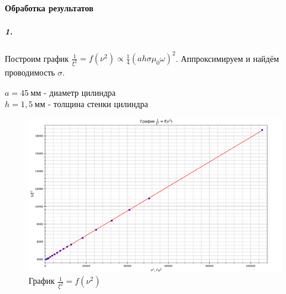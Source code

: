 \documentclass[a4paper,12pt]{article}
\begin{document}
\paragraph{Обработка результатов\\}
\subparagraph{1.} Построим график $\frac{1}{\xi^2}=f(\nu^2)\propto \frac{1}{4}(ah\sigma \mu_0 \omega)^2$. Аппроксимируем и найдём проводимость $\sigma$.
\begin{center}
    $a = 45~мм$ - диаметр цилиндра\\
    $h = 1,5~мм$ - толщина стенки цилиндра
\end{center}
\begin{figure}[!h]
\centering
\includegraphics[width=0.9\linewidth]{graph1.png}
\caption{График $\frac{1}{\xi^{2}} = f(\nu^2)$}
\label{fig:mpr}
\end{figure}
\end{document}
